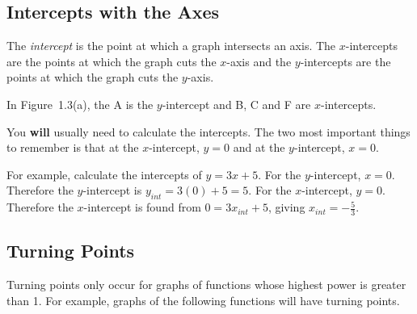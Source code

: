             \subsection{ Intercepts with the Axes}
            \nopagebreak
        \label{m39337*id236308}The \textsl{intercept} is the point at which a graph intersects an axis. The $x$-intercepts are the points at which the graph cuts the $x$-axis and the $y$-intercepts are the points at which the graph cuts the $y$-axis.\par 
        \label{m39337*id236356}In Figure~1.3(a), the A is the $y$-intercept and B, C and F are $x$-intercepts.\par 
        \label{m39337*id236384}You \textbf{will} usually need to calculate the intercepts. The two most important things to remember is that at the $x$-intercept, $y=0$ and at the $y$-intercept, $x=0$.\par 
        \label{m39337*id236442}For example, calculate the intercepts of $y=3x+5$. For the $y$-intercept, $x=0$. Therefore the $y$-intercept is ${y}_{int}=3\left(0\right)+5=5$. For the $x$-intercept, $y=0$. Therefore the $x$-intercept is found from $0=3{x}_{int}+5$, giving ${x}_{int}=-\frac{5}{3}$.\par 
      \label{m39337*uid47}
            \subsection{ Turning Points}
            \nopagebreak
        \label{m39337*id236645}Turning points only occur for graphs of functions whose highest power is greater than 1. For example, graphs of the following functions will have turning points.\par 
        \label{m39337*id236652}\nopagebreak\noindent{}
          

